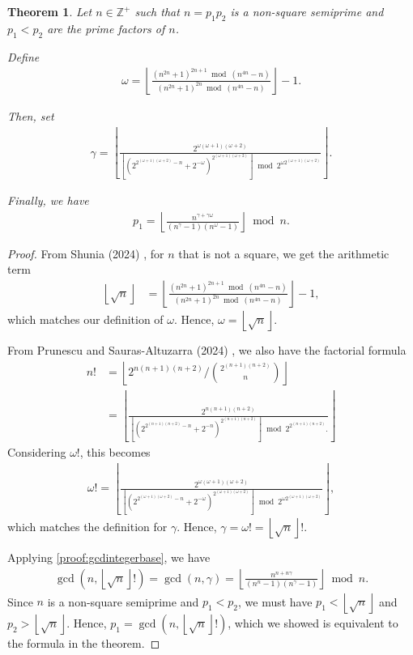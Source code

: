 \documentclass[11pt,reqno]{article}
\theoremstyle{plain}
\newtheorem{theorem}{Theorem}
\theoremstyle{definition}
\newcommand{\floor}[1]{\left\lfloor #1 \right\rfloor}
\begin{document}
\begin{theorem} \label{proof:semiprimefactorp1}
Let $n \in \mathbb{Z}^+$ such that $n = p_1 p_2$ is a non-square semiprime and $p_1 < p_2$ are the prime factors of $n$.

Define
\begin{align*}
\omega = \floor{\frac{(n^{2n} + 1)^{2n+1} \bmod (n^{4n}-n)}{(n^{2n} + 1)^{2n} \bmod (n^{4n}-n)}} - 1 .
\end{align*}

Then, set
\begin{align*}
\gamma = \floor
{
    \frac{2^{\omega (\omega+1)(\omega+2)}}
    {
        \floor
        {
        (2^{2^{(\omega+1)(\omega+2)} - n} + 2^{-\omega})^{ 2^{(\omega+1)(\omega+2)} }
        }
        \bmod 2^{\omega 2^{(\omega+1)(\omega+2)} }
    }
} .
\end{align*}

Finally, we have
\begin{align*}
p_1 = \floor{\frac{n^{\gamma+\gamma\omega}}{(n^\gamma-1)(n^\omega-1)}}\bmod n .
\end{align*}
\end{theorem}
\begin{proof}
From Shunia (2024) \cite{shunia2024polynomial}, for $n$ that is not a square, we get the arithmetic term
\begin{align*}
\floor{\sqrt{n}} &=
\floor{\frac{(n^{2n} + 1)^{2n+1} \bmod (n^{4n}-n)}{(n^{2n} + 1)^{2n} \bmod (n^{4n}-n)}} - 1 ,
\end{align*}
which matches our definition of $\omega$. Hence, $\omega = \floor{\sqrt{n}}$.

From Prunescu and Sauras-Altuzarra (2024) \cite{prunescu2024factorial}, we also have the factorial formula
\begin{align*}
n! &= \floor{2^{n(n+1)(n+2)} / \binom{2^{(n+1)(n+2)}}{n}} \\
&= \floor
{
    \frac
    {
        2^{n(n+1)(n+2)}
    }
    {
        \floor
        {
            \left(
                2^{2^{(n+1)(n+2)}-n} + 2^{-n}
            \right)^{2^{(n+1)(n+2)}}
        }
        \bmod
        2^{2^{(n+1)(n+2)}} .
    }
}
\end{align*}
Considering $\omega!$, this becomes
\begin{align*}
\omega! = \floor
{
    \frac{2^{\omega (\omega+1)(\omega+2)}}
    {
        \floor
        {
        (2^{2^{(\omega+1)(\omega+2)} - n} + 2^{-\omega})^{ 2^{(\omega+1)(\omega+2)} }
        }
        \bmod 2^{\omega 2^{(\omega+1)(\omega+2)} }
    }
} ,
\end{align*}
which matches the definition for $\gamma$. Hence, $\gamma = \omega! = \floor{\sqrt{n}}!$.

Applying \cref{proof:gcdintegerbase}, we have
\begin{align*}
    \gcd(n, \floor{\sqrt{n}}!) = \gcd(n,\gamma) = \floor{\frac{n^{n+n\gamma}}{(n^n-1)(n^{\gamma}-1)}}\bmod n .
\end{align*}
Since $n$ is a non-square semiprime and $p_1 < p_2$, we must have $p_1 < \floor{\sqrt{n}}$ and $p_2 > \floor{\sqrt{n}}$. Hence, $p_1 = \gcd(n,\floor{\sqrt{n}}!)$, which we showed is equivalent to the formula in the theorem.
\end{proof}
\end{document}
